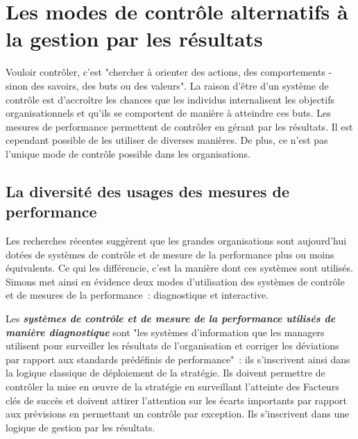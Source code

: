 \documentclass[oneside]{kaobook}
\begin{document}
\section{Les modes de contrôle alternatifs à la gestion par les résultats}
\label{sec:orgcc7e56d}
Vouloir contrôler, c'est "chercher à orienter des actions, des comportements - sinon des savoirs, des buts ou des valeurs". La raison d'être d'un système de contrôle est d'accroître les chances que les individus internalisent les objectifs organisationnels et qu'ils se comportent de manière à atteindre ces buts. Les mesures de performance permettent de contrôler en gérant par les résultats. Il est cependant possible de les utiliser de diverses manières. De plus, ce n'est pas l'unique mode de contrôle possible dans les organisations.
\subsection{La diversité des usages des mesures de performance}
\label{sec:org72cd78e}
Les recherches récentes suggèrent que les grandes organisations sont aujourd'hui dotées de systèmes de contrôle et de mesure de la performance plus ou moins équivalents. Ce qui les différencie, c'est la manière dont ces systèmes sont utilisés. Simons met ainsi en évidence deux modes d'utilisation des systèmes de contrôle et de mesures de la performance : diagnostique et interactive.

Les \emph{\textbf{systèmes de contrôle et de mesure de la performance utilisés de manière diagnostique}} sont "les systèmes d'information que les managers utilisent pour surveiller les résultats de l'organisation et corriger les déviations par rapport aux standards prédéfinis de performance" : ils s'inscrivent ainsi dans la logique classique de déploiement de la stratégie. Ils doivent permettre de contrôler la mise en œuvre de la stratégie en surveillant l'atteinte des Facteurs clés de succès et doivent attirer l'attention sur les écarts importants par rapport aux prévisions en permettant un contrôle par exception. Ils s'inscrivent dans une logique de gestion par les résultats.
\end{document}
